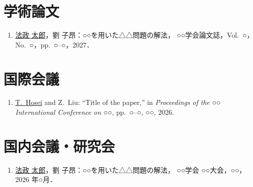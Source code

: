 \begin{publications}

\section*{学術論文}
\begin{enumerate}
  \item \underline{法政 太郎}，劉 子昂：○○を用いた△△問題の解法，
    ○○学会論文誌，Vol.~○，No.~○，pp.~○--○，2027．
\end{enumerate}

\section*{国際会議}
\begin{enumerate}
  \item \underline{T.~Hosei} and Z.~Liu: ``Title of the paper,''
    in \textit{Proceedings of the ○○ International Conference on ○○}, pp.~○--○, ○○, 2026.
\end{enumerate}

\section*{国内会議・研究会}
\begin{enumerate}
  \item \underline{法政 太郎}，劉 子昂：○○を用いた△△問題の解法，
    ○○学会 ○○大会，○○，2026 年○月．
\end{enumerate}

\end{publications}
